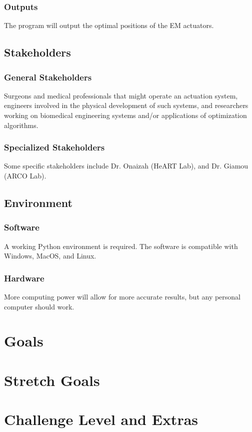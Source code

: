 \documentclass{article}
\begin{document}
\subsubsection{Outputs}
The program will output the optimal positions of the EM actuators. 

\subsection{Stakeholders}
\subsubsection{General Stakeholders}
Surgeons and medical professionals that might operate an actuation system, engineers involved in the physical development of such systems, and researchers working on biomedical engineering systems and/or applications of optimization algorithms.

\subsubsection{Specialized Stakeholders}
Some specific stakeholders include Dr. Onaizah (HeART Lab), and Dr. Giamou (ARCO Lab).  

\subsection{Environment}
\subsubsection{Software}
A working Python environment is required. The software is compatible with Windows, MacOS, and Linux.

\subsubsection{Hardware}
More computing power will allow for more accurate results, but any personal computer should work. 

\section{Goals}

\section{Stretch Goals}

\section{Challenge Level and Extras}
\end{document}
